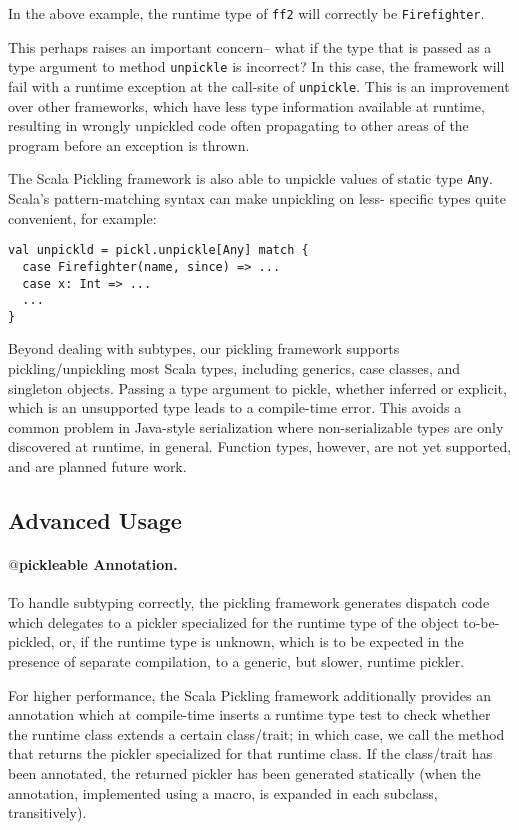 \documentclass[preprint,10pt]{sigplanconf}
\theoremstyle{definition}
\newcommand{\term}[1]{\mbox{\texttt{#1}}}
\begin{document}
In the above example, the runtime type of \term{ff2} will correctly be
\term{Firefighter}.

This perhaps raises an important concern-- what if the type that is passed as
a type argument to method \term{unpickle} is incorrect? In this case, the
framework will fail with a runtime exception at the call-site of
\term{unpickle}. This is an improvement over other frameworks, which have less
type information available at runtime, resulting in wrongly unpickled code
often propagating to other areas of the program before an exception is thrown.

The Scala Pickling framework is also able to unpickle values of static type
\term{Any}. Scala's pattern-matching syntax can make unpickling on less-
specific types quite convenient, for example:

\begin{lstlisting}
val unpickld = pickl.unpickle[Any] match {
  case Firefighter(name, since) => ...
  case x: Int => ...
  ...
}
\end{lstlisting}

Beyond dealing with subtypes, our pickling framework supports
pickling/unpickling most Scala types, including generics, case classes, and
singleton objects. Passing a type argument to pickle, whether inferred or
explicit, which is an unsupported type leads to a compile-time error. This
avoids a common problem in Java-style serialization where non-serializable
types are only discovered at runtime, in general. Function types, however, are
not yet supported, and are planned future work.

\subsection{Advanced Usage}

\paragraph{$@$pickleable Annotation.} To handle subtyping correctly, the
pickling framework generates dispatch code which delegates to a pickler
specialized for the runtime type of the object to-be-pickled, or, if the
runtime type is unknown, which is to be expected in the presence of separate
compilation, to a generic, but slower, runtime pickler.

For higher performance, the Scala Pickling framework additionally provides an
annotation which at compile-time inserts a runtime type test to check whether
the runtime class extends a certain class/trait; in which case, we call the
method that returns the pickler specialized for that runtime class. If the
class/trait has been annotated, the returned pickler has been generated
statically (when the annotation, implemented using a macro, is expanded in
each subclass, transitively).
\end{document}
